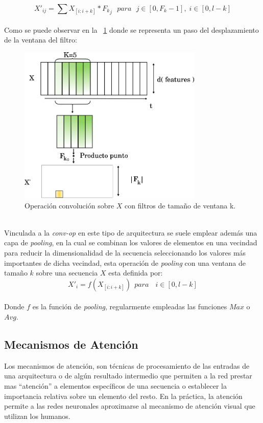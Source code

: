 	\begin{equation}
		X'_{ij} = \sum X_{[i:i+k]} * {F_k}_j ~~~ para ~~~ j \in [0, F_k-1], \;i \in [0, l-k]
	\end{equation}
	\\
	Como se puede observar en la \figurename~\ref{cnn} donde se representa un paso del desplazamiento de la ventana del filtro:
	\begin{figure}[!thb]
		\begin{center}
			\includegraphics[width=250pt]{images/cnn.eps}
		\end{center}
		\caption[Operación Convolución. CNN]{Operación convolución sobre $X$ con filtros de tamaño de ventana k. }
		\label{cnn}
	\end{figure}
	\\
	Vinculada a la \textit{conv-op} en este tipo de arquitectura se suele emplear además una capa de \textit{pooling}, en la cual se combinan los valores de elementos en una vecindad para reducir la dimensionalidad de la secuencia seleccionando los valores más importantes de dicha vecindad, esta operación de \textit{pooling} con una ventana de tamaño $k$  sobre una secuencia $X$ esta definida por:
	\begin{equation}
		X'_i = f(X_{[i:i+k]}) ~~ para ~~~  \;i \in [0, l-k]
	\end{equation}
	\\
	Donde $f$ es la función de \textit{pooling}, regularmente empleadas las funciones $Max$ o $Avg$.
		
\subsection{Mecanismos de Atención}\label{atencion}

	Los mecanismos de atención, son técnicas de procesamiento de las entradas de una arquitectura o de algún resultado intermedio que permiten a la red prestar mas ``atención'' a elementos específicos de una secuencia o establecer la importancia relativa sobre un elemento del resto. En la práctica, la atención permite a las redes neuronales aproximarse al mecanismo de atención visual que utilizan los humanos.

